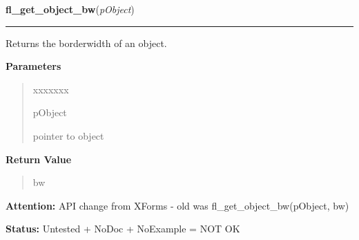 \hspace{.8\funcindent}\begin{boxedminipage}{\funcwidth}

    \raggedright \textbf{fl\_get\_object\_bw}(\textit{pObject})

    \vspace{-1.5ex}

    \rule{\textwidth}{0.5\fboxrule}
\setlength{\parskip}{2ex}
    Returns the borderwidth of an object.

\setlength{\parskip}{1ex}
      \textbf{Parameters}
      \vspace{-1ex}

      \begin{quote}
        \begin{Ventry}{xxxxxxx}

          \item[pObject]

          pointer to object

        \end{Ventry}

      \end{quote}

      \textbf{Return Value}
    \vspace{-1ex}

      \begin{quote}
      bw

      \end{quote}

\textbf{Attention:} API change from XForms - old was fl\_get\_object\_bw(pObject, bw)



\textbf{Status:} Untested + NoDoc + NoExample = NOT OK



    \end{boxedminipage}

    \label{xformslib:library:fl_set_object_resize}

    \vspace{0.5ex}

